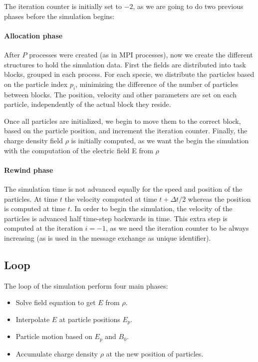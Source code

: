 \documentclass[a4paper]{report}
\newcommand{\dt}{\Delta t}
\begin{document}
The iteration counter is initially set to $-2$, as we are going to do two 
previous phases before the simulation begins:

\paragraph{Allocation phase}
After $P$ processes were created (as in MPI processes), now we create the 
different structures to hold the simulation data. First the fields are 
distributed into task blocks, grouped in each process. For each specie, we 
distribute the particles based on the particle index $p_i$, minimizing the 
difference of the number of particles between blocks. The position, velocity and 
other parameters are set on each particle, independently of the actual block 
they reside.

Once all particles are initialized, we begin to move them to the correct block, 
based on the particle position, and increment the iteration counter. Finally, 
the charge density field $\rho$ is initially computed, as we want the begin the 
simulation with the computation of the electric field E from $\rho$

\paragraph{Rewind phase} The simulation time is not advanced equally for the 
speed and position of the particles. At time $t$ the velocity computed at time 
$t + \dt/2$ whereas the position is computed at time $t$. In order to begin the 
simulation, the velocity of the particles is advanced half time-step backwards 
in time. This extra step is computed at the iteration $i=-1$, as we need the 
iteration counter to be always increasing (as is used in the message exchange as 
unique identifier).

\subsection{Loop}

The loop of the simulation perform four main phases:

\begin{itemize}
\item Solve field equation to get $E$ from $\rho$.
\item Interpolate $E$ at particle positions $E_p$.
\item Particle motion based on $E_p$ and $B_0$.
\item Accumulate charge density $\rho$ at the new position of particles.
\end{itemize}
\end{document}
